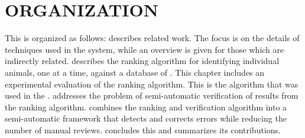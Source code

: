 

\section{ORGANIZATION} %
    This \thesis{} is organized as follows:
     describes related work.
    The focus is on the details of techniques used in the system, while an overview is given for those which are
      indirectly related.
     describes the ranking algorithm for identifying individual animals, one \annot{} at a
      time, against a database of \exemplars{}.
    This chapter includes an experimental evaluation of the ranking algorithm.
    This is the algorithm that was used in the \GZC{}.
     addresses the problem of semi-automatic verification of results from the ranking
      algorithm.
     combines the ranking and verification algorithm into a semi-automatic framework that
      detects and corrects errors while reducing the number of manual reviews.
     concludes this \thesis{} and summarizes its contributions.
